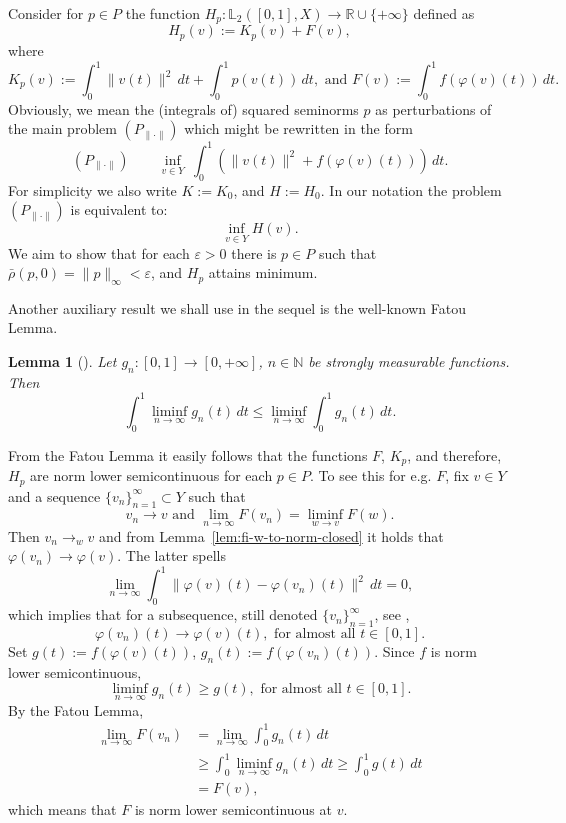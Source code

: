 \documentclass[12pt,leqno]{article}
\newtheorem{lem}[thm]{Lemma}          %
\theoremstyle{definition}
\theoremstyle{remark}
\def\N{\mathbb{N}}
\def\L{\mathbb{L}}
\begin{document}
Consider for $p\in P$ the function $H_p:\L_2([0,1],X) \to \mathbb{R} \cup \{+\infty\}$ defined as
$$
    H_p(v) := K_p(v) + F(v),
$$
where
$$
    K_p(v) := \int_0^1 \|v(t)\|^2\, dt + \int_0^1 p(v(t))\, dt, \text{ and }
    F(v) := \int_0^1 f(\varphi(v)(t))\, dt.
$$
Obviously, we mean the (integrals of) squared seminorms $p$  as perturbations of the main problem $(P_{\|\cdot\|})$ which might be rewritten in the form
\begin{equation}\label{problem}
(P_{\|\cdot\|})\qquad \inf_{v\in Y}\  \int_0^1\left(\|v(t)\|^2+f(\varphi(v)(t))\right) \, d t.
\end{equation}
For simplicity we also write $K := K_0$, and $
    H := H_0$.
In our notation the problem $(P_{\|\cdot\|})$ is equivalent to:
$$
 \inf_{v\in Y}   H(v) .
$$
We aim to show that for each $\varepsilon > 0$ there is $p\in P$ such that $\bar\rho(p,0) = \|p\|_\infty < \varepsilon$, and $H_p$ attains minimum.

Another auxiliary result we shall use in the sequel is the well-known Fatou Lemma.

\begin{lem}[{\cite[Theorem~1.28]{rudin_real_complex}}]\label{lem:fatu}
    Let $g_n: [0,1] \to [0,+\infty]$, $n\in \N$ be strongly measurable functions. Then
    $$
        \int_0^1 \liminf_{n\to\infty} g_n(t) \, dt \le \liminf_{n\to\infty} \int_0^1 g_n(t) \, dt.
    $$
\end{lem}
From the Fatou Lemma it easily follows that the functions $F$, $K_p$,  and  therefore, $H_p$ are norm lower semicontinuous for each $p\in P$. To see this for e.g. $F$, fix $v\in Y$ and a sequence $\{v_n\}_{n=1}^\infty\subset Y$ such that
$$
  v_n\to v\text{ and } \lim_{n\to\infty} F(v_n)= \liminf_{w\to v} F(w).
$$
Then $v_n \to_w v$ and from Lemma~\ref{lem:fi-w-to-norm-closed} it holds that
$
  \varphi(v_n)\to \varphi(v)$.
The latter spells
$$
    \lim_{n\to\infty} \int_0^1 \|\varphi(v) (t) -\varphi(v_n) (t)\|^2\, dt = 0,
$$
which implies that for a subsequence, still denoted $\{v_n\}_{n=1}^\infty $, see \cite[Theorem~3.12]{rudin_real_complex},
$$
    \varphi(v_n) (t) \to  \varphi(v) (t),\text{ for almost all }t\in[0,1].
$$
Set
$
    g(t) := f(\varphi(v)(t))$, $g_n(t) := f (\varphi(v_n)(t))$.
Since $f$ is norm lower semicontinuous,
$$
    \liminf_{n\to\infty} g_n(t) \ge  g(t),\text{ for almost all }t\in[0,1].
$$
By the Fatou Lemma,
\begin{align*}
    \lim_{n\to\infty} F(v_n) &= \lim_{n\to\infty} \int_0^1 g_n(t) \, dt\\
    &\ge \int_0^1 \liminf_{n\to\infty} g_n(t) \, dt \ge \int_0^1 g(t) \, dt\\[10pt]
    &= F(v),
\end{align*}
which means that $F$ is norm lower semicontinuous at $v$.
\end{document}
